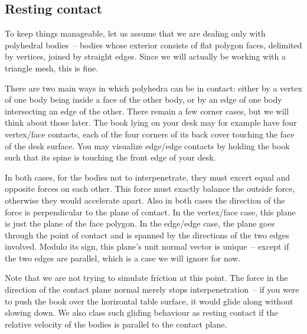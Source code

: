 \subsection{Resting contact}

To keep things manageable, let us assume that we are dealing only with polyhedral bodies~-- bodies
whose exterior consists of flat polygon faces, delimited by vertices, joined by straight edges.
Since we will actually be working with a triangle mesh, this is fine.

There are two main ways in which polyhedra can be in contact: either by a vertex of one body being
inside a face of the other body, or by an edge of one body intersecting an edge of the other.
There remain a few corner cases, but we will think about those later. The book lying on your desk
may for example have four vertex/face contacts, each of the four corners of its back cover
touching the face of the desk surface. You may visualize edge/edge contacts by holding the book
such that its spine is touching the front edge of your desk.

In both cases, for the bodies not to interpenetrate, they must excert equal and opposite forces on
each other. This force must exactly balance the outside force, otherwise they would accelerate
apart. Also in both cases the direction of the force is perpendicular to the plane of contact. In
the vertex/face case, this plane is just the plane of the face polygon. In the edge/edge case, the
plane goes through the point of contact and is spanned by the directions of the two edges involved.
Modulo its sign, this plane's unit normal vector is unique~-- except if the two edges are
parallel, which is a case we will ignore for now.

Note that we are not trying to simulate friction at this point. The force in the direction of the
contact plane normal merely stops interpenetration~-- if you were to push the book over the
horizontal table surface, it would glide along without slowing down. We also class such gliding
behaviour as resting contact if the relative velocity of the bodies is parallel to the contact
plane.

